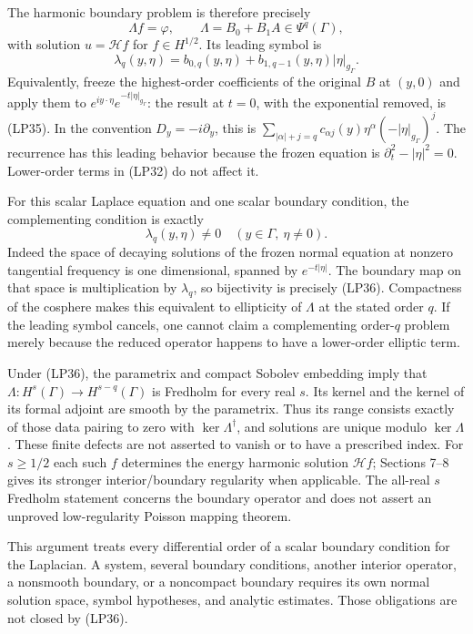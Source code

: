 \documentclass[
  11pt,
]{article}
\begin{document}
The harmonic boundary problem is therefore precisely \[
 \Lambda f=\varphi,\qquad \Lambda=B_0+B_1A\in\Psi^q(\Gamma),
 \tag{LP34}
\] with solution \(u=\mathcal H f\) for \(f\in H^{1/2}\). Its leading
symbol is \[
 \lambda_q(y,\eta)=b_{0,q}(y,\eta)
                   +b_{1,q-1}(y,\eta)|\eta|_{g_\Gamma}.
 \tag{LP35}
\] Equivalently, freeze the highest-order coefficients of the original
\(B\) at \((y,0)\) and apply them to
\(e^{iy\cdot\eta}e^{-t|\eta|_{g_\Gamma}}\): the result at \(t=0\), with
the exponential removed, is (LP35). In the convention
\(D_y=-i\partial_y\), this is
\(\sum_{|\alpha|+j=q}c_{\alpha j}(y)\eta^\alpha(-|\eta|_{g_\Gamma})^j\).
The recurrence has this leading behavior because the frozen equation is
\(\partial_t^2-|\eta|^2=0\). Lower-order terms in (LP32) do not affect
it.

For this scalar Laplace equation and one scalar boundary condition, the
complementing condition is exactly \[
 \lambda_q(y,\eta)\ne0\quad(y\in\Gamma,\ \eta\ne0).
 \tag{LP36}
\] Indeed the space of decaying solutions of the frozen normal equation
at nonzero tangential frequency is one dimensional, spanned by
\(e^{-t|\eta|}\). The boundary map on that space is multiplication by
\(\lambda_q\), so bijectivity is precisely (LP36). Compactness of the
cosphere makes this equivalent to ellipticity of \(\Lambda\) at the
stated order \(q\). If the leading symbol cancels, one cannot claim a
complementing order-\(q\) problem merely because the reduced operator
happens to have a lower-order elliptic term.

Under (LP36), the parametrix and compact Sobolev embedding imply that
\(\Lambda:H^s(\Gamma)\to H^{s-q}(\Gamma)\) is Fredholm for every real
\(s\). Its kernel and the kernel of its formal adjoint are smooth by the
parametrix. Thus its range consists exactly of those data pairing to
zero with \(\ker\Lambda^\dagger\), and solutions are unique modulo
\(\ker\Lambda\). These finite defects are not asserted to vanish or to
have a prescribed index. For \(s\ge1/2\) each such \(f\) determines the
energy harmonic solution \(\mathcal H f\); Sections 7--8 gives its
stronger interior/boundary regularity when applicable. The all-real
\(s\) Fredholm statement concerns the boundary operator and does not
assert an unproved low-regularity Poisson mapping theorem.

This argument treats every differential order of a scalar boundary
condition for the Laplacian. A system, several boundary conditions,
another interior operator, a nonsmooth boundary, or a noncompact
boundary requires its own normal solution space, symbol hypotheses, and
analytic estimates. Those obligations are not closed by (LP36).
\end{document}
